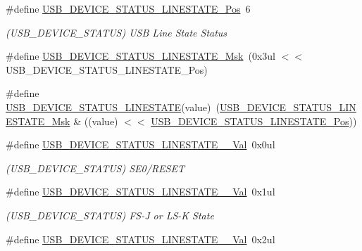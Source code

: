 \begin{DoxyCompactItemize}
\item 
\#define \mbox{\hyperlink{group___s_a_m_d21___u_s_b_ga8e62dd599a4f4a34806c7677b9eaec13}{U\+S\+B\+\_\+\+D\+E\+V\+I\+C\+E\+\_\+\+S\+T\+A\+T\+U\+S\+\_\+\+L\+I\+N\+E\+S\+T\+A\+T\+E\+\_\+\+Pos}}~6
\begin{DoxyCompactList}\small\item\em (U\+S\+B\+\_\+\+D\+E\+V\+I\+C\+E\+\_\+\+S\+T\+A\+T\+US) U\+SB Line State Status \end{DoxyCompactList}\item 
\#define \mbox{\hyperlink{group___s_a_m_d21___u_s_b_gae4c5bb001e55193ff458fd84fdd1a054}{U\+S\+B\+\_\+\+D\+E\+V\+I\+C\+E\+\_\+\+S\+T\+A\+T\+U\+S\+\_\+\+L\+I\+N\+E\+S\+T\+A\+T\+E\+\_\+\+Msk}}~(0x3ul $<$$<$ U\+S\+B\+\_\+\+D\+E\+V\+I\+C\+E\+\_\+\+S\+T\+A\+T\+U\+S\+\_\+\+L\+I\+N\+E\+S\+T\+A\+T\+E\+\_\+\+Pos)
\item 
\#define \mbox{\hyperlink{group___s_a_m_d21___u_s_b_gafec00050379b98671e72985b0d3ca232}{U\+S\+B\+\_\+\+D\+E\+V\+I\+C\+E\+\_\+\+S\+T\+A\+T\+U\+S\+\_\+\+L\+I\+N\+E\+S\+T\+A\+TE}}(value)~(\mbox{\hyperlink{group___s_a_m_d21___u_s_b_gae4c5bb001e55193ff458fd84fdd1a054}{U\+S\+B\+\_\+\+D\+E\+V\+I\+C\+E\+\_\+\+S\+T\+A\+T\+U\+S\+\_\+\+L\+I\+N\+E\+S\+T\+A\+T\+E\+\_\+\+Msk}} \& ((value) $<$$<$ \mbox{\hyperlink{group___s_a_m_d21___u_s_b_ga8e62dd599a4f4a34806c7677b9eaec13}{U\+S\+B\+\_\+\+D\+E\+V\+I\+C\+E\+\_\+\+S\+T\+A\+T\+U\+S\+\_\+\+L\+I\+N\+E\+S\+T\+A\+T\+E\+\_\+\+Pos}}))
\item 
\#define \mbox{\hyperlink{group___s_a_m_d21___u_s_b_ga6bb81d63d6025c58fd88e81a5522be60}{U\+S\+B\+\_\+\+D\+E\+V\+I\+C\+E\+\_\+\+S\+T\+A\+T\+U\+S\+\_\+\+L\+I\+N\+E\+S\+T\+A\+T\+E\+\_\+\_\+\+Val}}~0x0ul
\begin{DoxyCompactList}\small\item\em (U\+S\+B\+\_\+\+D\+E\+V\+I\+C\+E\+\_\+\+S\+T\+A\+T\+US) S\+E0/\+R\+E\+S\+ET \end{DoxyCompactList}\item 
\#define \mbox{\hyperlink{group___s_a_m_d21___u_s_b_ga9be5dcded3e3389526af7731a279e9a7}{U\+S\+B\+\_\+\+D\+E\+V\+I\+C\+E\+\_\+\+S\+T\+A\+T\+U\+S\+\_\+\+L\+I\+N\+E\+S\+T\+A\+T\+E\+\_\+\_\+\+Val}}~0x1ul
\begin{DoxyCompactList}\small\item\em (U\+S\+B\+\_\+\+D\+E\+V\+I\+C\+E\+\_\+\+S\+T\+A\+T\+US) F\+S-\/J or L\+S-\/K State \end{DoxyCompactList}\item 
\#define \mbox{\hyperlink{group___s_a_m_d21___u_s_b_gaff76a55f7d0040b772b73bc0164b9717}{U\+S\+B\+\_\+\+D\+E\+V\+I\+C\+E\+\_\+\+S\+T\+A\+T\+U\+S\+\_\+\+L\+I\+N\+E\+S\+T\+A\+T\+E\+\_\+\_\+\+Val}}~0x2ul

\end{DoxyCompactItemize}
